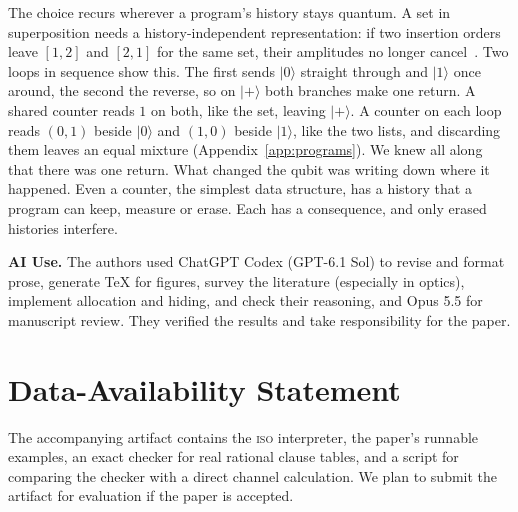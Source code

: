 \documentclass[acmsmall,screen,review,anonymous,nonacm]{acmart}
\newcommand{\ket}[1]{\lvert #1\rangle}
\numberwithin{equation}{section}
\begin{document}
The choice recurs wherever a program's history stays quantum. A set in superposition needs a history-independent representation: if two insertion orders leave $[1,2]$ and $[2,1]$ for the same set, their amplitudes no longer cancel~\cite[\S~1.2, Def.~3.1]{YuanCarbin22Tower}. Two loops in sequence show this. The first sends $\ket0$ straight through and $\ket1$ once around, the second the reverse, so on $\ket+$ both branches make one return. A shared counter reads $1$ on both, like the set, leaving $\ket+$. A counter on each loop reads $(0,1)$ beside $\ket0$ and $(1,0)$ beside $\ket1$, like the two lists, and discarding them leaves an equal mixture (Appendix~\ref{app:programs}). We knew all along that there was one return. What changed the qubit was writing down where it happened. Even a counter, the simplest data structure, has a history that a program can keep, measure or erase. Each has a consequence, and only erased histories interfere.

\par\smallskip\noindent\textbf{AI Use.}
The authors used ChatGPT Codex (GPT-6.1 Sol) to revise and format prose, generate TeX for
figures, survey the literature (especially in optics), implement allocation and hiding,
and check their reasoning, and Opus 5.5 for manuscript review. They
verified the results and take responsibility for the paper.

\clearpage
\section*{Data-Availability Statement}
The accompanying artifact contains the \textsc{iso} interpreter, the paper's runnable
examples, an exact checker for real rational clause tables, and a script for comparing
the checker with a direct channel calculation. We plan to submit the artifact for
evaluation if the paper is accepted.
\end{document}
